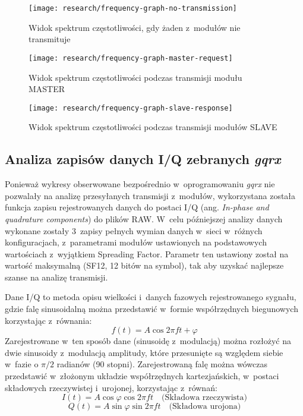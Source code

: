 \begin{figure}[!htbp]
    \centering
    \texttt{[image: research/frequency-graph-no-transmission]}
    \caption{\label{img:frequency-graph-no-transmission}Widok spektrum częstotliwości, gdy żaden z~modułów nie transmituje}
\end{figure}

\begin{figure}[!htbp]
    \centering
    \texttt{[image: research/frequency-graph-master-request]}
    \caption{\label{img:frequency-graph-master-request}Widok spektrum częstotliwości podczas transmisji modułu MASTER}
\end{figure}

\begin{figure}[!htbp]
    \centering
    \texttt{[image: research/frequency-graph-slave-response]}
    \caption{\label{img:frequency-graph-slave-response}Widok spektrum częstotliwości podczas transmisji modułów SLAVE}
\end{figure}

\FloatBarrier
\subsection{\label{sect:iq-data-gqrx}Analiza zapisów danych I/Q zebranych \textsl{gqrx}} Ponieważ wykresy obserwowane
bezpośrednio w~oprogramowaniu \textsl{gqrx} nie pozwalały na analizę przesyłanych transmisji z~modułów, wykorzystana
została funkcja zapisu rejestrowanych danych do postaci I/Q (ang. \textsl{In-phase and quadrature components}) do plików
RAW. W~celu późniejszej analizy danych wykonane zostały 3~zapisy pełnych wymian danych w~sieci w~różnych konfiguracjach,
z~parametrami modułów ustawionych na podstawowych wartościach z~wyjątkiem Spreading Factor. Parametr ten ustawiony
został na wartość maksymalną (SF12, 12 bitów na symbol), tak aby uzyskać najlepsze szanse na analizę transmisji.

Dane I/Q to metoda opisu wielkości i~danych fazowych rejestrowanego sygnału, gdzie falę sinusoidalną można przedstawić
w~formie współrzędnych biegunowych \cite{ni-iq-data} korzystając z~równania:
\begin{equation}
    f(t) = A\cos{2\pi{ft}+\varphi}
\end{equation}
Zarejestrowane w~ten sposób dane (sinusoidę z~modulacją) można rozłożyć na dwie sinusoidy z~modulacją amplitudy, które
przesunięte są względem siebie w~fazie o ${\pi}/2$ radianów (90 stopni). Zarejestrowaną falę można wówczas przedstawić
w~złożonym układzie współrzędnych kartezjańskich, w~postaci składowych rzeczywistej i~urojonej, korzystając z~równań:
\begin{equation}
    I(t) = A\cos{\varphi}\cos{2\pi{ft}} \quad\text{(Składowa rzeczywista)}
\end{equation}
\begin{equation}
    Q(t) = A\sin{\varphi}\sin{2\pi{ft}} \quad\text{(Składowa urojona)}
\end{equation}

